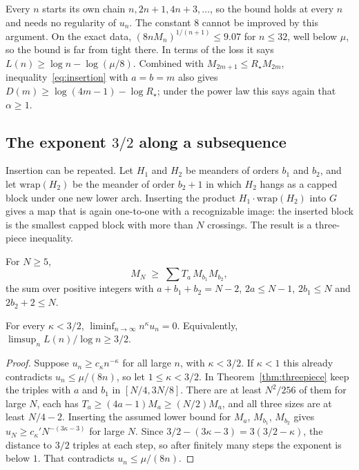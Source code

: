 Every $n$ starts its own chain $n,2n+1,4n+3,\ldots$, so the bound holds at every $n$ and needs no
regularity of $u_n$. The constant $8$ cannot be improved by this argument. On the exact data,
$(8nM_n)^{1/(n+1)}\le9.07$ for $n\le32$, well below $\mu$, so the bound is far from tight there. In
terms of the loss it says $L(n)\ge\log n-\log(\mu/8)$. Combined with $M_{2m+1}\le R_\star M_{2m}$, inequality~\eqref{eq:insertion} with $a=b=m$ also gives
$D(m)\ge\log(4m-1)-\log R_\star$; under the power law this says again that $\alpha\ge1$.

\subsection{The exponent \texorpdfstring{$3/2$}{3/2} along a subsequence}

Insertion can be repeated. Let $H_1$ and $H_2$ be meanders of orders $b_1$ and $b_2$, and let
$\mathrm{wrap}(H_2)$ be the meander of order $b_2+1$ in which $H_2$ hangs as a capped block under one
new lower arch. Inserting the product $H_1\cdot\mathrm{wrap}(H_2)$ into $G$ gives a map that is again
one-to-one with a recognizable image: the inserted block is the smallest capped block with more than
$N$ crossings. The result is a three-piece inequality.

\begin{theorem}\label{thm:threepiece}
For $N\ge5$,
\[ M_N\;\ge\;\sum T_a\,M_{b_1}M_{b_2}, \]
the sum over positive integers with $a+b_1+b_2=N-2$, $2a\le N-1$, $2b_1\le N$ and $2b_2+2\le N$.
\end{theorem}

\begin{theorem}\label{thm:threehalves}
For every $\kappa<3/2$, $\liminf_{n\to\infty}n^\kappa u_n=0$. Equivalently,
$\limsup_n L(n)/\log n\ge3/2$.
\end{theorem}

\begin{proof}
Suppose $u_n\ge c_\kappa n^{-\kappa}$ for all large $n$, with $\kappa<3/2$. If $\kappa<1$ this already
contradicts $u_n\le\mu/(8n)$, so let $1\le\kappa<3/2$. In
Theorem~\ref{thm:threepiece} keep the triples with $a$ and $b_1$ in $[N/4,3N/8]$. There are at least
$N^2/256$ of them for large $N$, each has $T_a\ge(4a-1)M_a\ge (N/2)M_a$, and all three sizes are at
least $N/4-2$. Inserting the assumed lower bound for $M_a$, $M_{b_1}$, $M_{b_2}$ gives
$u_N\ge c_\kappa'N^{-(3\kappa-3)}$ for large $N$. Since $3/2-(3\kappa-3)=3(3/2-\kappa)$, the distance to
$3/2$ triples at each step, so after finitely many steps the exponent is below $1$. That contradicts
$u_n\le\mu/(8n)$.
\end{proof}

